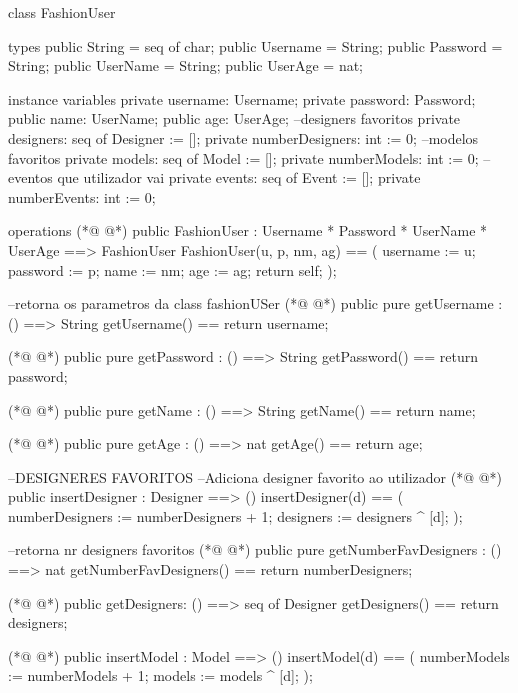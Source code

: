 \begin{vdmpp}[breaklines=true]
class FashionUser

types
 public String = seq of char;
 public Username = String;
 public Password = String;
 public UserName = String;
 public UserAge = nat;
 
instance variables
 private username: Username;
 private password: Password;
 public name: UserName;
 public age: UserAge;
 --designers favoritos
 private  designers: seq of Designer := [];
 private  numberDesigners: int := 0;
  --modelos favoritos
 private  models: seq of Model := [];
 private  numberModels: int := 0;
 --eventos que utilizador vai
 private events: seq of Event := [];
 private  numberEvents: int := 0;

operations  
(*@
\label{FashionUser:26}
@*)
  public FashionUser : Username *
            Password *
            UserName *
            UserAge  ==> FashionUser
  FashionUser(u, p, nm, ag) ==
  (
   username := u;
   password := p;
    name := nm;
    age := ag;
    return self;
  );
  
  --retorna os parametros da class fashionUSer
(*@
\label{getUsername:40}
@*)
  public pure getUsername : () ==> String
    getUsername() == return username;
    
(*@
\label{getPassword:43}
@*)
  public pure getPassword : () ==> String
    getPassword() == return password;
  
(*@
\label{getName:46}
@*)
  public pure getName : () ==> String
    getName() == return name;
    
(*@
\label{getAge:49}
@*)
   public pure getAge : () ==> nat
     getAge() == return age;
     
  
   
    --DESIGNERES FAVORITOS  
   --Adiciona designer favorito ao utilizador
(*@
\label{insertDesigner:56}
@*)
  public insertDesigner : Designer ==> ()
   insertDesigner(d) ==
   (
     numberDesigners := numberDesigners + 1;
     designers := designers ^ [d];
   );
   
  --retorna nr designers favoritos
(*@
\label{getNumberFavDesigners:64}
@*)
   public pure getNumberFavDesigners : () ==> nat
   getNumberFavDesigners() == return numberDesigners;
   
(*@
\label{getDesigners:67}
@*)
   public getDesigners: () ==> seq of Designer
   getDesigners() == return designers;
   
   
(*@
\label{insertModel:71}
@*)
   public insertModel : Model ==> ()
   insertModel(d) ==
   (
     numberModels := numberModels + 1;
     models := models ^ [d];
   );
   

\end{vdmpp}

